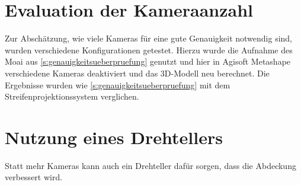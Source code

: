\documentclass[./00PhotoBox.tex]{subfiles}
\begin{document}
\section{Evaluation der Kameraanzahl}
Zur Abschätzung, wie viele Kameras für eine gute Genauigkeit notwendig sind, wurden verschiedene Konfigurationen getestet. Hierzu wurde die Aufnahme des Moai aus \autoref{s:genauigkeitsueberpruefung} genutzt und hier in Agisoft Metashape verschiedene Kameras deaktiviert und das 3D-Modell neu berechnet. Die Ergebnisse wurden wie \autoref{s:genauigkeitsueberpruefung} mit dem Streifenprojektionssystem verglichen.


\section{Nutzung eines Drehtellers}
Statt mehr Kameras kann auch ein Drehteller dafür sorgen, dass die Abdeckung verbessert wird.

\biblio
\end{document}
